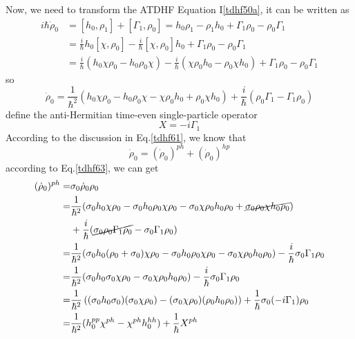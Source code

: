   Now, we need to transform the ATDHF Equation I\eqref{tdhf50a}, it can be written as
  \begin{equation}
    \begin{aligned}
      i\hbar\dot{\rho}_0 &= [h_0, \rho_1] + [\Gamma_1, \rho_0] = h_0\rho_1 - \rho_1h_0 + \Gamma_1\rho_0 - \rho_0\Gamma_1 \\ \label{tdhf62}
      &= \frac{i}{\hbar}h_0[\chi,\rho_0] - \frac{i}{\hbar}[\chi,\rho_0]h_0 + \Gamma_1\rho_0 - \rho_0\Gamma_1 \\
      &= \frac{i}{\hbar}(h_0\chi\rho_0 - h_0\rho_0\chi) - \frac{i}{\hbar}(\chi\rho_0h_0 - \rho_0\chi h_0) + \Gamma_1\rho_0 - \rho_0\Gamma_1
    \end{aligned}
  \end{equation}
  so
  \begin{equation}
    \dot{\rho}_0 = \frac{1}{\hbar^2}(h_0\chi\rho_0 - h_0\rho_0\chi - \chi\rho_0h_0 + \rho_0\chi h_0) + \frac{i}{\hbar}(\rho_0\Gamma_1 - \Gamma_1\rho_0)  \label{tdhf63}
  \end{equation}
  define the anti-Hermitian time-even single-particle operator
  \begin{equation}
    X = -i\Gamma_1  \label{tdhf64}
  \end{equation}
  According to the discussion in Eq.\eqref{tdhf61}, we know that
  \begin{equation}
    \dot{\rho}_0 = (\dot{\rho}_0)^{ph} + (\dot{\rho}_0)^{hp} \label{tdhf65}
  \end{equation}
  according to Eq.\eqref{tdhf63}, we can get
  \begin{equation}
    \begin{aligned}
      (\dot{\rho}_0)^{ph} =& \sigma_0\dot{\rho}_0\rho_0 \\ \label{tdhf66}
      =& \frac{1}{\hbar^2}(\sigma_0h_0\chi\rho_0 - \sigma_0h_0\rho_0\chi\rho_0 - \sigma_0\chi\rho_0h_0\rho_0 + \cancel{\sigma_0\rho_0\chi h_0\rho_0}) \\
       &+ \frac{i}{\hbar}(\cancel{\sigma_0\rho_0\Gamma_1\rho_0} - \sigma_0\Gamma_1\rho_0)\\
      =& \frac{1}{\hbar^2}(\sigma_0h_0(\rho_0 + \sigma_0)\chi\rho_0 - \sigma_0h_0\rho_0\chi\rho_0 - \sigma_0\chi\rho_0h_0\rho_0) - \frac{i}{\hbar} \sigma_0\Gamma_1\rho_0\\
      =& \frac{1}{\hbar^2}(\sigma_0h_0\sigma_0\chi\rho_0 - \sigma_0\chi\rho_0h_0\rho_0) - \frac{i}{\hbar} \sigma_0\Gamma_1\rho_0\\
      =& \frac{1}{\hbar^2}\left((\sigma_0h_0\sigma_0)(\sigma_0\chi\rho_0) - (\sigma_0\chi\rho_0)(\rho_0h_0\rho_0)\right) + \frac{1}{\hbar} \sigma_0(-i\Gamma_1)\rho_0\\
      =& \frac{1}{\hbar^2}(h_0^{pp}\chi^{ph} - \chi^{ph}h_0^{hh}) + \frac{1}{\hbar}X^{ph}
    \end{aligned}
  \end{equation}
